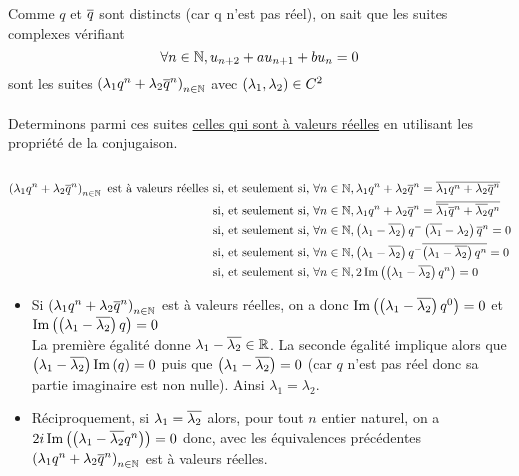 \begin{dem}
\begin{itemize}
        Comme \(q\) et \(\overline{q}\) sont distincts (car q n'est pas réel), on sait que les suites complexes vérifiant 
        \[\forall n \in \mathbb{N},u_{n+2} + au_{n+1}+bu_n = 0\]
        sont les suites \(\left(\lambda_1 q^n + \lambda_2\overline{q}^n\right)_{n \in \mathbb{N}}\) avec \(\left(\lambda_1,\lambda_2\right)\in C^2\) \\~\\
        Determinons parmi ces suites \underline{celles qui sont à valeurs réelles} en utilisant les propriété de la conjugaison. \\~\\
        \begin{align*}
        \left(\lambda_1q^n + \lambda_2 \overline{q}^n\right)_{n \in \mathbb{N}} \text{ est à valeurs réelles } &\text{si, et seulement si, } \forall n \in \mathbb{N},\lambda_1 q^n + \lambda_2 \overline{q}^n =\overline{\lambda_1 q^n + \lambda_2 \overline{q}^n} \\
        &\text{si, et seulement si, } \forall n \in \mathbb{N},\lambda_1 q^n + \lambda_2 \overline{q}^n =\overline{\overline{\lambda_1} \overline{q}^n + \overline{\lambda_2} q^n}\\
        &\text{si, et seulement si, } \forall n \in \mathbb{N},\left(\lambda_1 -\overline{\lambda_2}\right)q^ - \left(\overline{\lambda_1}-\lambda_2\right)\overline{q}^n = 0 \\
        &\text{si, et seulement si, } \forall n \in \mathbb{N},\left(\lambda_1 -\overline{\lambda_2}\right)q^ - \overline{\left(\lambda_1-\overline{\lambda_2}\right)q^n} = 0 \\
        &\text{si, et seulement si, } \forall n \in \mathbb{N},2 \operatorname{Im}\left(\left(\lambda_1-\overline{\lambda_2}\right)q^n\right) = 0 
        \end{align*}
        \begin{itemize}
            \item Si \(\left(\lambda_1 q^n + \lambda_2\overline{q}^n\right)_{n \in \mathbb{N}}\)  est à valeurs réelles, on a donc \(\operatorname{Im}\left(\left(\lambda_1-\overline{\lambda_2}\right)q^0\right) = 0 \) et \(\operatorname{Im}\left(\left(\lambda_1-\overline{\lambda_2}\right)q\right) = 0 \)\\
            La première égalité donne \(\lambda_1 - \overline{\lambda_2} \in \mathbb{R}\). La seconde égalité implique alors que \(\left(\lambda_1-\overline{\lambda_2}\right)\operatorname{Im}\left(q\right) =0\) puis que \(\left(\lambda_1-\overline{\lambda_2}\right) = 0\) (car \(q\) n'est pas réel donc sa partie imaginaire est non nulle). Ainsi \(\lambda_1 = \lambda_2\).
            \item Réciproquement, si \(\lambda_1 = \overline{\lambda_2}\) alors, pour tout \(n\) entier naturel, on a \(2i \operatorname{Im}\left(\left(\lambda_1-\overline{\lambda_2}q^n\right)\right) = 0\) donc, avec les équivalences précédentes \(\left(\lambda_1q^n + \lambda_2 \overline{q}^n\right)_{n \in \mathbb{N}}\) est à valeurs réelles. 

\end{itemize}
\end{itemize}
\end{dem}
